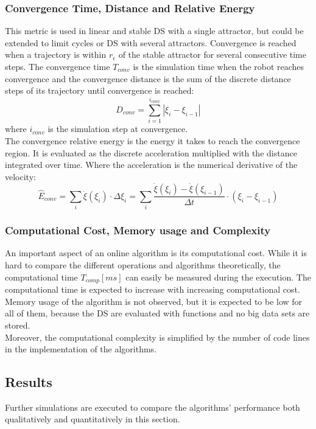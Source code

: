 \subsubsection{Convergence Time, Distance and Relative Energy}
This metric is used in linear and stable DS with a single attractor, but could be extended to limit cycles or DS with several attractors. Convergence is reached when a trajectory is within $r_\epsilon$ of the stable attractor for several consecutive time steps. The convergence time $T_{conv}$ is the simulation time when the robot reaches convergence and the convergence distance is the sum of the discrete distance steps of its trajectory until convergence is reached:
\begin{equation}
D_{conv} = \sum_{i=1}^{i_{conv}} \left| \xi_i -\xi_{i-1} \right|
\end{equation}
where $i_{conv}$ is the simulation step at convergence. \\
The convergence relative energy is the energy it takes to reach the convergence region. It is evaluated as the discrete acceleration multiplied with the distance integrated over time. Where the acceleration is the numerical derivative of the velocity:
\begin{equation}
\hat E_{conv} = \sum_i \ddot{\xi}(\xi_i) \cdot \Delta \xi_i = \sum_i \frac{\dot{\xi}(\xi_i) - \dot{\xi}(\xi_{i-1})}{\Delta t} \cdot \left( \xi_i - \xi_{i-1} \right)
\end{equation}

\subsubsection{Computational Cost, Memory usage and Complexity}
An important aspect of an online algorithm is its computational cost. While it is hard to compare the different operations and algorithms theoretically, the computational time $T_{comp} [ms]$ can easily be measured during the execution. The computational time is expected to increase with increasing computational cost. \\
Memory usage of the algorithm is not observed, but it is expected to be low for all of them, because the DS are evaluated with functions and no big data sets are stored. \\
Moreover, the computational complexity is simplified by the number of code lines in the implementation of the algorithms.


\subsection{Results}
Further simulations are executed to compare the algorithms' performance both qualitatively and quantitatively in this section.











